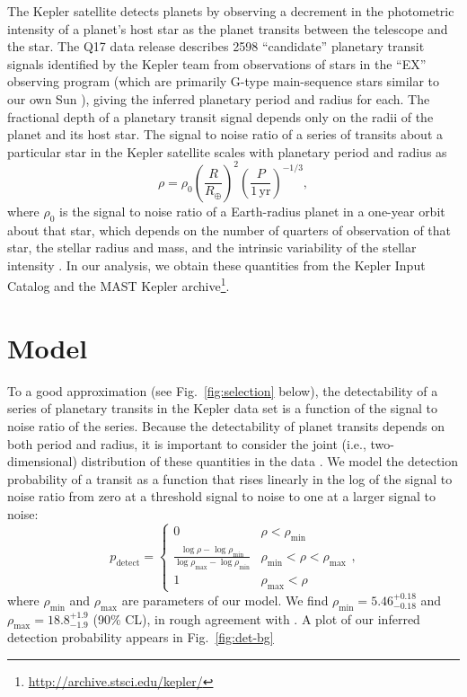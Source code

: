 \documentclass[apjl]{emulateapj}
\newcommand{\REarth}{R_\oplus}
\newcommand{\rhomin}{\rho_\mathrm{min}}
\newcommand{\rhomax}{\rho_\mathrm{max}}
\newcommand{\rhominrange}{5.46^{+0.18}_{-0.18}}
\newcommand{\rhomaxrange}{18.8^{+1.9}_{-1.9}}
\begin{document}
The Kepler satellite detects planets by observing a decrement in the
photometric intensity of a planet's host star as the planet transits
between the telescope and the star.  The Q17 data release describes
2598 ``candidate'' planetary transit signals identified by the Kepler
team from observations of stars in the ``EX'' observing program (which
are primarily G-type main-sequence stars similar to our own Sun
\citep{Batalha2010}), giving the inferred planetary period and radius
for each.  The fractional depth of a planetary transit signal depends
only on the radii of the planet and its host star.  The signal to
noise ratio of a series of transits about a particular star in the
Kepler satellite scales with planetary period and radius
as \citep{Chatterjee2012}
\begin{equation}
  \rho = \rho_0 \left( \frac{R}{\REarth} \right)^2 \left(
  \frac{P}{1\,\mathrm{yr}} \right)^{-1/3},
\end{equation}
where $\rho_0$ is the signal to noise ratio of a Earth-radius planet
in a one-year orbit about that star, which depends on the number of
quarters of observation of that star, the stellar radius and mass, and
the intrinsic variability of the stellar intensity
\citep{Christiansen2012}.  In our analysis, we obtain these quantities
from the Kepler Input Catalog \citep{Batalha2010,Brown2011} and the
MAST Kepler archive\footnote{\url{http://archive.stsci.edu/kepler/}}.

\section{Model}

To a good approximation (see Fig.\ \ref{fig:selection} below), the
detectability of a series of planetary transits in the Kepler data set
is a function of the signal to noise ratio of the series.  Because the
detectability of planet transits depends on both period and radius, it
is important to consider the joint (i.e., two-dimensional)
distribution of these quantities in the data
\citep{Tabachnik2002,Youdin2011}.  We model the detection probability
of a transit as a function that rises linearly in the log of the
signal to noise ratio from zero at a threshold signal to noise to one
at a larger signal to noise:
\begin{equation}
  \label{eq:pdetect}
  p_\mathrm{detect} = \begin{cases}
    0 & \rho < \rhomin \\
    \frac{\log \rho - \log \rhomin}{\log \rhomax - \log \rhomin} &
    \rhomin < \rho < \rhomax \\
    1 & \rhomax < \rho
  \end{cases},
\end{equation}
where $\rhomin$ and $\rhomax$ are parameters of our model.  We find
$\rhomin = \rhominrange$ and $\rhomax = \rhomaxrange$ (90\% CL), in
rough agreement with \citet{Borucki2011,Batalha2013}.  A plot of our
inferred detection probability appears in Fig.\ \ref{fig:det-bg}
\end{document}
